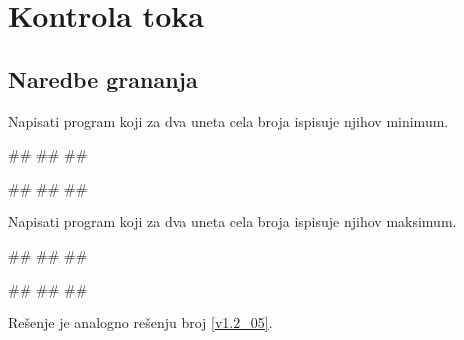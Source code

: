 \chapter{Kontrola toka}


\section{Naredbe grananja}


\begin{Exercise}[label=v1.2_05] 
Napisati program koji za dva uneta cela broja  ispisuje njihov minimum.

\begin{miditest}
\begin{upotreba}{1}
#\naslovInt#
##
##
\end{upotreba}
\end{miditest}
\begin{miditest}
\begin{upotreba}{2}
#\naslovInt#
##
##
\end{upotreba}
\end{miditest}

\end{Exercise}
\ifresenja
 \begin{Answer}[ref=v1.2_05]
\end{Answer}
\fi

\begin{Exercise}[label=v1.2_05a] 
Napisati program koji za dva uneta cela broja ispisuje njihov maksimum. 

\begin{miditest}
\begin{upotreba}{1}
#\naslovInt#
##
##
\end{upotreba}
\end{miditest}
\begin{miditest}
\begin{upotreba}{2}
#\naslovInt#
##
##
\end{upotreba}
\end{miditest}

\end{Exercise}
\ifresenja
 \begin{Answer}[ref=v1.2_05a]	
Rešenje je analogno rešenju broj \ref{v1.2_05}.
\end{Answer}
\fi


